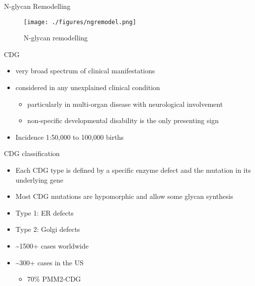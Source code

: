 \documentclass[presentation, smaller]{beamer}
\begin{document}
\begin{frame}[label={sec:orgdbe7e3f}]{N-glycan Remodelling}
\begin{figure}[htbp]
\centering
\texttt{[image: ./figures/ngremodel.png]}
\caption{\label{fig:orgc4a2202}
N-glycan remodelling}
\end{figure}
\end{frame}

\begin{frame}[label={sec:org1b497ae}]{CDG}
\begin{itemize}
\item very broad spectrum of clinical manifestations
\item considered in any unexplained clinical condition
\begin{itemize}
\item particularly in multi-organ disease with neurological involvement
\item non-specific developmental disability is the only presenting sign
\end{itemize}
\item Incidence 1:50,000 to 100,000 births
\end{itemize}
\end{frame}

\begin{frame}[label={sec:orgc8200aa}]{CDG classification}
\begin{itemize}
\item Each CDG type is defined by a specific enzyme defect and the mutation in its underlying gene
\item Most CDG mutations are hypomorphic and allow some glycan synthesis
\item Type 1: ER defects
\item Type 2: Golgi defects
\item \textasciitilde{}1500+ cases worldwide
\item \textasciitilde{}300+ cases in the US
\begin{itemize}
\item 70\% PMM2-CDG
\end{itemize}
\end{itemize}
\end{frame}
\end{document}
